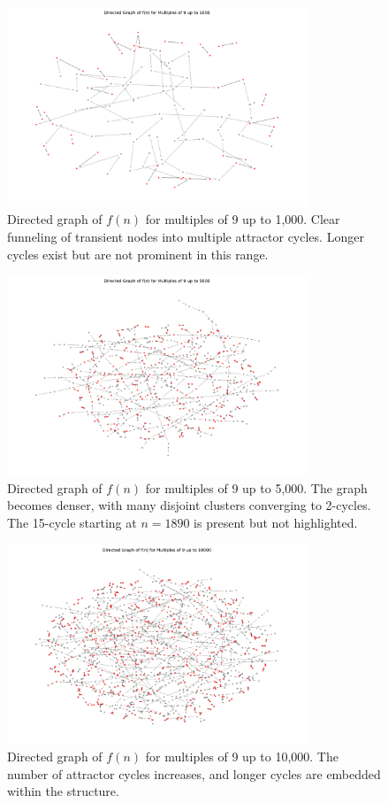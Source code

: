 \documentclass[12pt]{article}
\begin{document}
\begin{figure}[h!]
    \centering
    \includegraphics[width=0.8\textwidth]{fig_cycles_graph_N1000.png}
    \caption{Directed graph of $f(n)$ for multiples of 9 up to 1,000. Clear funneling of transient nodes into multiple attractor cycles. Longer cycles exist but are not prominent in this range.}
\end{figure}

\begin{figure}[h!]
    \centering
    \includegraphics[width=0.8\textwidth]{fig_cycles_graph_N5000.png}
    \caption{Directed graph of $f(n)$ for multiples of 9 up to 5,000. The graph becomes denser, with many disjoint clusters converging to 2-cycles. The 15-cycle starting at $n=1890$ is present but not highlighted.}
\end{figure}

\begin{figure}[h!]
    \centering
    \includegraphics[width=0.8\textwidth]{fig_cycles_graph_N10000.png}
    \caption{Directed graph of $f(n)$ for multiples of 9 up to 10,000. The number of attractor cycles increases, and longer cycles are embedded within the structure.}
\end{figure}
\end{document}
